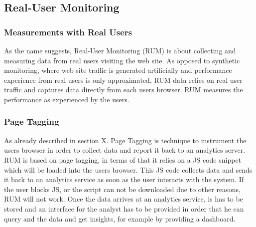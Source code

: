 









\subsection{Real-User Monitoring}


\subsubsection{Measurements with Real Users}

As the name suggests, Real-User Monitoring (RUM) is about collecting and measuring data from real users visiting the web site.
As opposed to synthetic monitoring, where web site traffic is generated artificially and performance experience from real users is only approximated, RUM data relies on real user traffic and captures data directly from each users browser. 
RUM measures the performance as experienced by the users. %




\subsubsection{Page Tagging}


As already described in section X. Page Tagging is technique to instrument the users browser in order to collect data and report it back to an analytics server.
RUM is based on page tagging, in terms of that it relies on a JS code snippet which will be loaded into the users browser.
This JS code collects data and sends it back to an analytics service as soon as the user interacts with the system.
If the user blocks JS, or the script can not be downloaded due to other reasons,  RUM will not work.
Once the data arrives at an analytics service, is has to be stored and an interface for the analyst has to be provided in order that he can query and the data and get insights, for example by providing a dashboard. %

